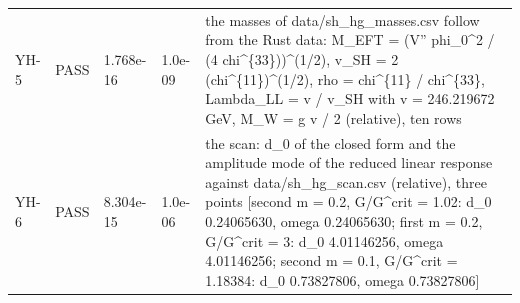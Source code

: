 \documentclass[aps,prd,onecolumn,superscriptaddress,nofootinbib,floatfix,longbibliography]{revtex4-2}
\begin{document}
\begin{longtable}{p{}p{}p{}p{}p{}}
YH-5 & PASS & 1.768e-16 & 1.0e-09 & the masses of data/sh\_hg\_masses.csv follow from the Rust data: M\_EFT = (V'' phi\_0\textasciicircum{}2 / (4 chi\textasciicircum{}\{33\}))\textasciicircum{}(1/2), v\_SH = 2 (chi\textasciicircum{}\{11\})\textasciicircum{}(1/2), rho = chi\textasciicircum{}\{11\} / chi\textasciicircum{}\{33\}, Lambda\_LL = v / v\_SH with v = 246.219672 GeV, M\_W = g v / 2 (relative), ten rows \\
YH-6 & PASS & 8.304e-15 & 1.0e-06 & the scan: d\_0 of the closed form and the amplitude mode of the reduced linear response against data/sh\_hg\_scan.csv (relative), three points [second m = 0.2, G/G\textasciicircum{}crit = 1.02: d\_0 0.24065630, omega 0.24065630; first m = 0.2, G/G\textasciicircum{}crit = 3: d\_0 4.01146256, omega 4.01146256; second m = 0.1, G/G\textasciicircum{}crit = 1.18384: d\_0 0.73827806, omega 0.73827806] \\

\end{longtable}
\end{document}
